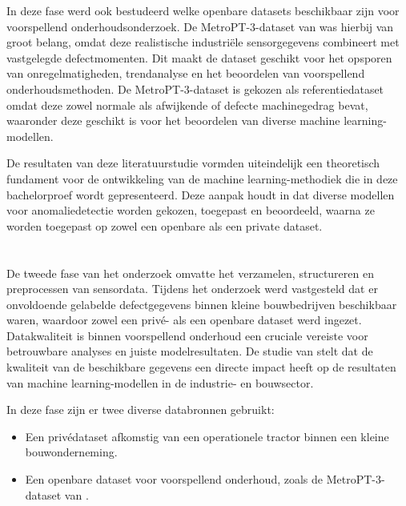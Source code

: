 In deze fase werd ook bestudeerd welke openbare datasets beschikbaar zijn voor voorspellend onderhoudsonderzoek. De MetroPT-3-dataset van \textcite{Veloso2022} was hierbij van groot belang, omdat deze realistische industriële sensorgegevens combineert met vastgelegde defectmomenten. Dit maakt de dataset geschikt voor het opsporen van onregelmatigheden, trendanalyse en het beoordelen van voorspellend onderhoudsmethoden. De MetroPT-3-dataset is gekozen als referentiedataset omdat deze zowel normale als afwijkende of defecte machinegedrag bevat, waaronder deze geschikt is voor het beoordelen van diverse machine learnin\-g-modellen.

De resultaten van deze literatuurstudie vormden uiteindelijk een theoretisch fundament voor de ontwikkeling van de machine learning-methodiek die in deze bachelorproef wordt gepresenteerd. Deze aanpak houdt in dat diverse modellen voor anomaliedetectie worden gekozen, toegepast en beoordeeld, waarna ze worden toegepast op zowel een openbare als een private dataset.


\section{}%
\label{sec: Dataverzameling en preprocessing}

De tweede fase van het onderzoek omvatte het verzamelen, structureren en preprocessen van sensordata. Tijdens het onderzoek werd vastgesteld dat er onvoldoende gelabelde defectgegevens binnen kleine bouwbedrijven beschikbaar waren, waardoor zowel een privé- als een openbare dataset werd ingezet. Datakwaliteit is binnen voorspellend onderhoud een cruciale vereiste voor betrouwbare analyses en juiste modelresultaten. De studie van \textcite{Carvalho2019} stelt dat de kwaliteit van de beschikbare gegevens een directe impact heeft op de resultaten van machine learning-modellen in de industrie- en bouwsector.

In deze fase zijn er twee diverse databronnen gebruikt:

\begin{itemize}
    
    \item Een privédataset afkomstig van een operationele tractor binnen een kleine bouwonderneming.
    
    \item Een openbare dataset voor voorspellend onderhoud, zoals de MetroPT-3-datas\-et van \textcite{Veloso2022}.
    
 \end{itemize}
 
